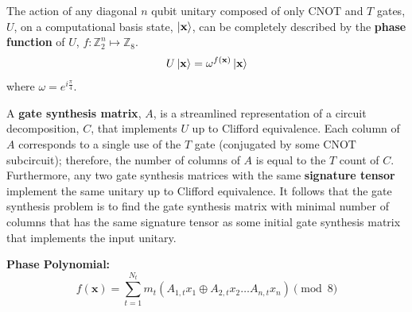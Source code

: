 \documentclass[a0,landscape]{a0poster}
\begin{document}
\begin{multicols}{3}
\begin{minipage}[b]{\linewidth}
		\begin{tcolorbox}[title=\textcolor{white}{\huge\textbf{\textsf{Diagonal CNOT + T Framework}\textcolor{black}{y}}}]
			The action of any diagonal $n$ qubit unitary composed of only $\mathrm{CNOT}$ and $T$ gates, $U$, on a computational basis state, $\ket{\mathbf{x}}$, can be completely described by the \textbf{phase function} of $U$, $f:\mathbb{Z}_2^n \mapsto \mathbb{Z}_8$.
			\begin{equation*}
			U\ket{\mathbf{x}} = \omega^{f(\mathbf{x})}\ket{\mathbf{x}}
			\end{equation*}
			where $\omega = e^{i\frac{\pi}{4}}$.
			

			
			A \textbf{gate synthesis matrix}, $A$, is a streamlined representation of a circuit decomposition, $C$, that implements $U$ up to Clifford equivalence. Each column of $A$ corresponds to a single use of the $T$ gate (conjugated by some $\mathrm{CNOT}$ subcircuit); therefore, the number of columns of $A$ is equal to the $T$ count of $C$.							
			Furthermore, any two gate synthesis matrices with the same \textbf{signature tensor} implement the same unitary up to Clifford equivalence.
			It follows that the gate synthesis problem is to find the gate synthesis matrix with minimal number of columns that has the same signature tensor as some initial gate synthesis matrix that implements the input unitary.
			
			\vspace{1cm}
			\begin{tcolorbox}
				\iffalse\textbf{Phase Polynomial:}
				\begin{equation*}
				f(\mathbf{x}) = \sum_{t=1}^{N_t}m_t(A_{1,t}x_1 \oplus A_{2,t}x_2 \dots A_{n,t} x_n) \pmod{8}
				\end{equation*}
				

\end{tcolorbox}
\end{tcolorbox}
\end{minipage}
\end{multicols}
\end{document}
